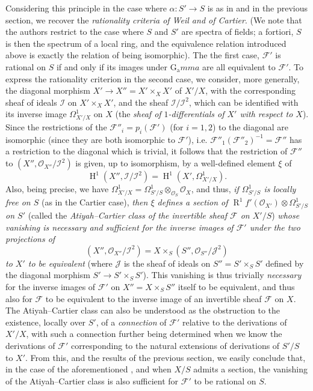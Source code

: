 Considering this principle in the case where $\alpha\colon S'\to S$ is as in  and  in the previous section, we recover the \emph{rationality criteria of Weil and of Cartier}.
(We note that the authors restrict to the case where $S$ and $S'$ are spectra of fields;
a fortiori, $S$ is then the spectrum of a local ring, and the equivalence relation introduced above is exactly the relation of being isomorphic).
The the first case, $\mathcal{F}'$ is rational on $S$ if and only if its images under $\operatorname{G_a}mma$ are all equivalent to $\mathcal{F}'$.
To express the rationality criterion in the second case, we consider, more generally, the diagonal morphism $X'\to X''=X'\times_X X'$ of $X'/X$, with the corresponding sheaf of ideals $\mathcal{I}$ on $X'\times_X X'$, and the sheaf $\mathcal{I}/\mathcal{I}^2$, which can be identified with its inverse image $\Omega_{X'/X}^1$ on $X$ (the \emph{sheaf of $1$-differentials of $X'$ with respect to $X$}).
Since the restrictions of the $\mathcal{F}''_i=p_i(\mathcal{F}')$ (for $i=1,2$) to the diagonal are isomorphic (since they are both isomorphic to $\mathcal{F}'$), i.e. $\mathcal{F}''_1(\mathcal{F}''_2)^{-1}=\mathcal{F}''$ has a restriction to the diagonal which is trivial, it follows that the restriction of $\mathcal{F}''$ to $(X'',\mathcal{O}_{X''}/\mathcal{I}^2)$ is given, up to isomorphism, by a well-defined element $\xi$ of
\[
    \operatorname{H}^1(X'',\mathcal{I}/\mathcal{I}^2)
    = \operatorname{H}^1(X',\Omega_{X'/X}^1).
\]
Also, being precise, we have $\Omega_{X'/X}^1=\Omega_{S'/S}^1\otimes_{\mathcal{O}_S}\mathcal{O}_X$, and thus, \emph{if $\Omega_{S'/S}^1$ is locally free on $S$} (as in the Cartier case), \emph{then $\xi$ defines a section of $\operatorname{R}^1f'(\mathcal{O}_{X'})\otimes\Omega_{S'/S}^1$ on $S'$} (called the \emph{Atiyah–Cartier class of the invertible sheaf $\mathcal{F}$ on $X'/S$}) \emph{whose vanishing is necessary and sufficient for the inverse images of $\mathcal{F}'$ under the two projections of}
\[
    (X'',\mathcal{O}_{X''}/\mathcal{I}^2)
    = X\times_S(S'',\mathcal{O}_{S''}/\mathcal{J}^2)
\]
\emph{to $X'$ to be equivalent} (where $\mathcal{J}$ is the sheaf of ideals on $S''=S'\times_S S'$ defined by the diagonal morphism $S'\to S'\times_S S'$).
This vanishing is thus trivially \emph{necessary} for the inverse images of $\mathcal{F}'$ on $X''=X\times_S S''$ itself to be equivalent, and thus also for $\mathcal{F}$ to be equivalent to the inverse image of an invertible sheaf $\mathcal{F}$ on $X$.
The Atiyah–Cartier class can also be understood as the obstruction to the existence, locally over $S'$, of a \emph{connection} of $\mathcal{F}'$ relative to the derivations of $X'/X$, with such a connection further being determined when we know the derivations of $\mathcal{F}'$ corresponding to the natural extensions of derivations of $S'/S$ to $X'$.
From this, and the results of the previous section, we easily conclude that, in the case of the aforementioned , and when $X/S$ admits a section, the vanishing of the Atiyah–Cartier class is also sufficient for $\mathcal{F}'$ to be rational on $S$.


